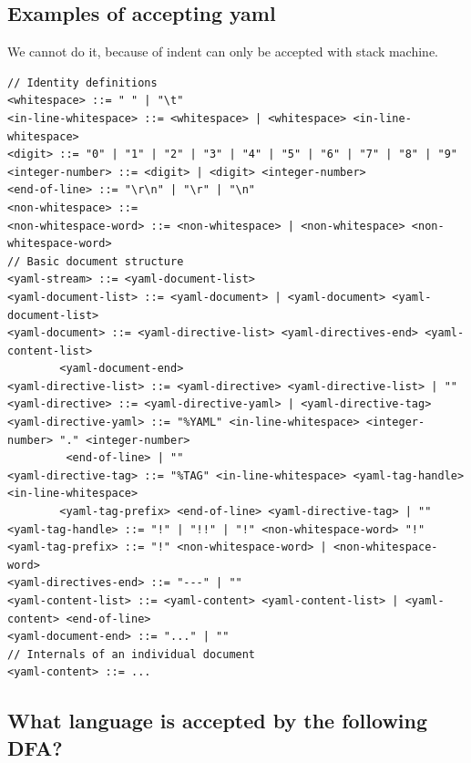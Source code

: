 \documentclass[a4paper]{exam}
\begin{document}
\subsection{Examples of accepting yaml}

We cannot do it, because of indent can only be accepted with stack machine.



\begin{verbatim}
// Identity definitions
<whitespace> ::= " " | "\t"
<in-line-whitespace> ::= <whitespace> | <whitespace> <in-line-whitespace>
<digit> ::= "0" | "1" | "2" | "3" | "4" | "5" | "6" | "7" | "8" | "9"
<integer-number> ::= <digit> | <digit> <integer-number>
<end-of-line> ::= "\r\n" | "\r" | "\n"
<non-whitespace> ::=
<non-whitespace-word> ::= <non-whitespace> | <non-whitespace> <non-whitespace-word>
// Basic document structure
<yaml-stream> ::= <yaml-document-list>
<yaml-document-list> ::= <yaml-document> | <yaml-document> <yaml-document-list>
<yaml-document> ::= <yaml-directive-list> <yaml-directives-end> <yaml-content-list>
        <yaml-document-end>
<yaml-directive-list> ::= <yaml-directive> <yaml-directive-list> | ""
<yaml-directive> ::= <yaml-directive-yaml> | <yaml-directive-tag>
<yaml-directive-yaml> ::= "%YAML" <in-line-whitespace> <integer-number> "." <integer-number>
         <end-of-line> | ""
<yaml-directive-tag> ::= "%TAG" <in-line-whitespace> <yaml-tag-handle> <in-line-whitespace> 
        <yaml-tag-prefix> <end-of-line> <yaml-directive-tag> | ""
<yaml-tag-handle> ::= "!" | "!!" | "!" <non-whitespace-word> "!"
<yaml-tag-prefix> ::= "!" <non-whitespace-word> | <non-whitespace-word>
<yaml-directives-end> ::= "---" | ""
<yaml-content-list> ::= <yaml-content> <yaml-content-list> | <yaml-content> <end-of-line>
<yaml-document-end> ::= "..." | ""
// Internals of an individual document
<yaml-content> ::= ...
\end{verbatim}



\subsection{What language is accepted by the following DFA?}

\end{document}
